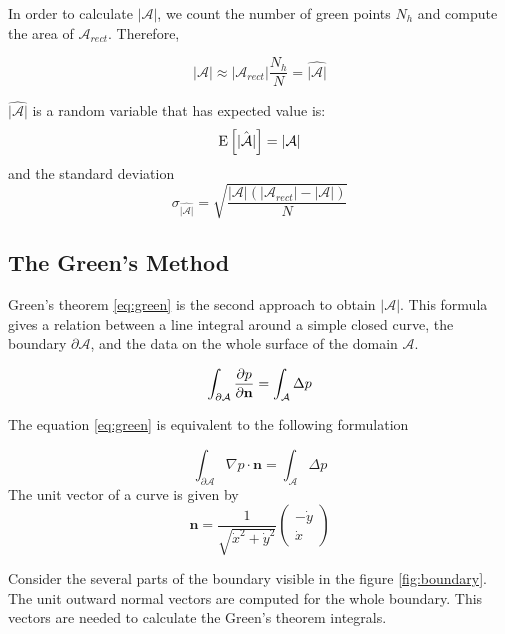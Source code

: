 In order to calculate $|\mathcal{A}|$, we count the number of green points $N_h$ and compute the area of $\mathcal{A}_{rect}$. Therefore,

\begin{equation}
|\mathcal{A}| \approx |\mathcal{A}_{rect}| \frac{N_h}{N} = \hat{|\mathcal{A}|}
\end{equation}

$\hat{|\mathcal{A}|}$ is a random variable that has expected value is:
\begin{equation}
\textnormal{E}\left[ \hat{|\mathcal{A}|}\right]=|\mathcal{A}|
\end{equation}
and the standard deviation 
\begin{equation}\label{eq:sdMC}
\sigma_{\hat{|\mathcal{A}|}} =\sqrt{\frac{|\mathcal{A}|(|\mathcal{A}_{rect}| -|\mathcal{A}| )}{N}}
\end{equation}

\subsection{The Green's Method}

Green's theorem \eqref{eq:green} is the second approach to obtain $|\mathcal{A}|$. This formula gives a relation between a line integral around a simple closed curve, the boundary $\partial\mathcal{A}$, and the data on the whole surface of the domain $\mathcal{A}$.

\begin{equation}
 \int_{\partial \mathcal{A}} \frac{\partial p}{\partial \bf n} = \int_\mathcal{A} \Delta p
 \label{eq:green}
\end{equation}

The equation \eqref{eq:green} is equivalent to the following formulation

%
\begin{equation}
 \int_{\partial \mathcal{A}} \nabla p\cdot \mathbf{n} = \int_\mathcal{A} \Delta p
 \label{eq:green2}
\end{equation}
%
The unit vector of a curve is given by
\[
\mathbf n = \frac{1}{\sqrt{{\dot x}^2+{\dot y}^2}}
\begin{pmatrix}
 -\dot y \\
 \dot x
\end{pmatrix}
\]

Consider the several parts of the boundary visible in the figure \ref{fig:boundary}. The unit outward normal vectors are computed for the whole boundary. This vectors are needed to calculate the Green's theorem integrals.

